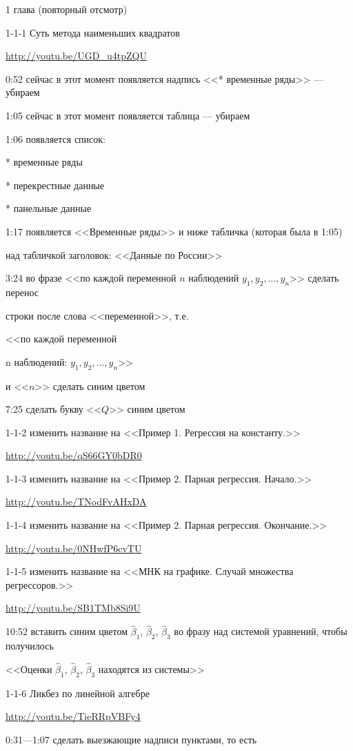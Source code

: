 \documentclass[12pt,a4paper]{article}
\newcommand{\hb}{\hat{\beta}}
\begin{document}
1 глава (повторный отсмотр)

1-1-1 Суть метода наименьших квадратов

\url{http://youtu.be/UGD_u4tpZQU}

0:52 сейчас в этот момент появляется надпись <<* временные ряды>> --- убираем

1:05 сейчас в этот момент появляется таблица --- убираем

1:06 появляется список:

* временные ряды

* перекрестные данные

* панельные данные

1:17 появляется <<Временные ряды>> и ниже табличка (которая была в 1:05)

над табличкой заголовок: <<Данные по России>>

3:24 во фразе <<по каждой переменной $n$ наблюдений $y_1, y_2, ..., y_n$>> сделать перенос

строки после слова <<переменной>>, т.е.

<<по каждой переменной

n наблюдений: $y_1, y_2, \ldots, y_n$>>

и <<$n$>> сделать синим цветом

7:25 сделать букву <<$Q$>> синим цветом

1-1-2 изменить название на <<Пример 1. Регрессия на константу.>>

\url{http://youtu.be/qS66GY0bDR0}


1-1-3 изменить название на <<Пример 2. Парная регрессия. Начало.>>

\url{http://youtu.be/TNodFvAHxDA}


1-1-4 изменить название на <<Пример 2. Парная регрессия. Окончание.>>

\url{http://youtu.be/0NHwfP6cvTU}


1-1-5 изменить название на <<МНК на графике. Случай множества регрессоров.>>

\url{http://youtu.be/SB1TMb8Si9U}

10:52 вставить синим цветом $\hb_1$, $\hb_2$, $\hb_3$ во фразу над системой уравнений, чтобы получилось

<<Оценки $\hb_1$, $\hb_2$, $\hb_3$ находятся из системы>>

1-1-6 Ликбез по линейной алгебре

\url{http://youtu.be/TieRRpVBFy4}

0:31---1:07 сделать выезжающие надписи пунктами, то есть
\end{document}

